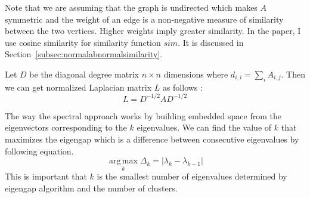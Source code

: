 Note that we are assuming that the graph is undirected which makes $A$ symmetric and the weight of an edge is a non-negative measure of similarity between the two vertices. 
Higher weights imply greater similarity. 
In the paper, I use cosine similarity for similarity function $sim$. It is discussed in Section~\ref{subsec:normalabnormalsimilarity}. 

Let $D$ be the diagonal degree matrix $n \times n$ dimensions where $d_{i,i} = \sum_{i} A_{i,j}$. 
Then we can get normalized Laplacian matrix $L$ as follows : 
\begin{equation}
L = D^{-1/2} A D^{-1/2}
\end{equation}

The way the spectral approach works by building embedded space from the eigenvectors corresponding to the $k$ eigenvalues. 
We can find the value of $k$ that maximizes the eigengap which is a difference between consecutive eigenvalues by following equation. 
\begin{equation}
\operatorname*{arg\,max}_{k} \Delta_k = | \lambda_k - \lambda_{k-1} | 
\end{equation}
This is important that $k$ is the smallest number of eigenvalues determined by eigengap algorithm and the number of clusters. 

